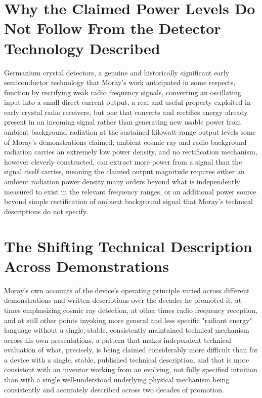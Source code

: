 \documentclass[11pt]{article}
\begin{document}
\section{Why the Claimed Power Levels Do Not Follow From the Detector Technology Described}

Germanium crystal detectors, a genuine and historically significant early semiconductor technology that Moray's work anticipated in some respects, function by rectifying weak radio frequency signals, converting an oscillating input into a small direct current output, a real and useful property exploited in early crystal radio receivers, but one that converts and rectifies energy already present in an incoming signal rather than generating new usable power from ambient background radiation at the sustained kilowatt-range output levels some of Moray's demonstrations claimed; ambient cosmic ray and radio background radiation carries an extremely low power density, and no rectification mechanism, however cleverly constructed, can extract more power from a signal than the signal itself carries, meaning the claimed output magnitude requires either an ambient radiation power density many orders beyond what is independently measured to exist in the relevant frequency ranges, or an additional power source beyond simple rectification of ambient background signal that Moray's technical descriptions do not specify.

\section{The Shifting Technical Description Across Demonstrations}

Moray's own accounts of the device's operating principle varied across different demonstrations and written descriptions over the decades he promoted it, at times emphasizing cosmic ray detection, at other times radio frequency reception, and at still other points invoking more general and less specific "radiant energy" language without a single, stable, consistently maintained technical mechanism across his own presentations, a pattern that makes independent technical evaluation of what, precisely, is being claimed considerably more difficult than for a device with a single, stable, published technical description, and that is more consistent with an inventor working from an evolving, not fully specified intuition than with a single well-understood underlying physical mechanism being consistently and accurately described across two decades of promotion.
\end{document}
